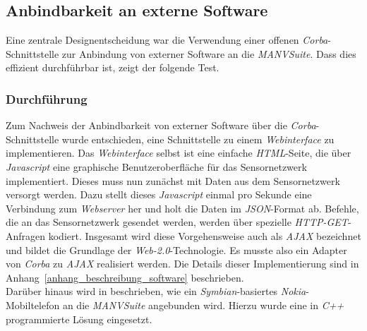 \subsection{Anbindbarkeit an externe Software}\label{anbindbarkeit_an_externe_software}
Eine zentrale Designentscheidung war die Verwendung einer offenen \emph{Corba}-Schnittstelle zur Anbindung
von externer Software an die \emph{MANVSuite}. Dass dies effizient durchführbar ist, zeigt der folgende
Test.

\subsubsection{Durchführung}
Zum Nachweis der Anbindbarkeit von externer Software über die \emph{Corba}-Schnittstelle wurde entschieden,
eine Schnittstelle zu einem \emph{Webinterface} zu implementieren. Das \emph{Webinterface} selbst ist
eine einfache \emph{HTML}-Seite, die über \emph{Javascript} eine graphische Benutzeroberfläche für das
Sensornetzwerk implementiert. Dieses muss nun zunächst mit Daten aus dem Sensornetzwerk versorgt werden. 
Dazu stellt dieses \emph{Javascript} einmal pro Sekunde eine Verbindung zum \emph{Webserver} her
und holt die Daten im \emph{JSON}-Format ab. Befehle, die an das Sensornetzwerk gesendet werden,
werden über spezielle \emph{HTTP-GET}-Anfragen kodiert. Insgesamt wird
diese Vorgehensweise auch als \emph{AJAX} bezeichnet und bildet die Grundlage der \emph{Web-2.0}-Technologie.
Es musste also ein Adapter von \emph{Corba} zu \emph{AJAX} realisiert werden. Die Details dieser
Implementierung sind in Anhang~\ref{anhang_beschreibung_software} beschrieben.\\
Darüber hinaus wird in \cite{Jan} beschrieben, wie ein \emph{Symbian}-basiertes \emph{Nokia}-Mo\-bil\-te\-le\-fon 
an die \emph{MANVSuite} angebunden wird. Hierzu wurde eine in \emph{C++} programmierte Lösung 
eingesetzt.


